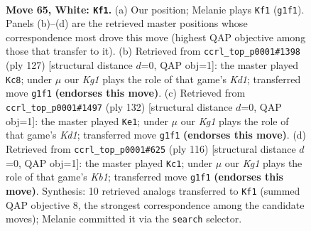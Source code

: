 \documentclass[11pt]{article}
\begin{document}
\clearpage

\begin{figure}[p]\centering
\begin{subfigure}{0.46\textwidth}\centering
\resizebox{\linewidth}{!}{%
\newchessgame
\chessboard[
  setfen={5k2/8/2r5/8/8/7R/8/6K1 w - - 10 65},
  showmover=false,
  pgfstyle=straightmove, color=movearrow, markmove={g1-f1}
]}
\caption{}
\end{subfigure}\hfill
\begin{subfigure}{0.46\textwidth}\centering
\resizebox{\linewidth}{!}{%
\newchessgame
\chessboard[
  setfen={3k4/8/7r/8/R7/8/8/3K4 b - - 6 64},
  showmover=false,
  pgfstyle=straightmove, color=movearrow, markmove={d8-c8}
]}
\caption{}
\end{subfigure}
\\[4pt]
\begin{subfigure}{0.46\textwidth}\centering
\resizebox{\linewidth}{!}{%
\newchessgame
\chessboard[
  setfen={2R5/5r2/8/8/6k1/8/8/3K4 w - - 13 67},
  showmover=false,
  pgfstyle=straightmove, color=movearrow, markmove={d1-e1}
]}
\caption{}
\end{subfigure}\hfill
\begin{subfigure}{0.46\textwidth}\centering
\resizebox{\linewidth}{!}{%
\newchessgame
\chessboard[
  setfen={2k5/8/6r1/7R/8/8/8/1K6 w - - 18 59},
  showmover=false,
  pgfstyle=straightmove, color=movearrow, markmove={b1-c1}
]}
\caption{}
\end{subfigure}
\caption{\textbf{Move 65, White: \texttt{Kf1}.} (a) Our position; Melanie plays \texttt{Kf1} (\texttt{g1f1}). Panels (b)--(d) are the retrieved master positions whose correspondence most drove this move (highest QAP objective among those that transfer to it). (b) Retrieved from \texttt{ccrl\_top\_p0001\#1398} (ply 127) [structural distance $d$=0, QAP obj=1]: the master played \texttt{Kc8}; under $\mu$ our \emph{Kg1} plays the role of that game's \emph{Kd1}; transferred move \texttt{g1f1} \textbf{(endorses this move)}. (c) Retrieved from \texttt{ccrl\_top\_p0001\#1497} (ply 132) [structural distance $d$=0, QAP obj=1]: the master played \texttt{Ke1}; under $\mu$ our \emph{Kg1} plays the role of that game's \emph{Kd1}; transferred move \texttt{g1f1} \textbf{(endorses this move)}. (d) Retrieved from \texttt{ccrl\_top\_p0001\#625} (ply 116) [structural distance $d$=0, QAP obj=1]: the master played \texttt{Kc1}; under $\mu$ our \emph{Kg1} plays the role of that game's \emph{Kb1}; transferred move \texttt{g1f1} \textbf{(endorses this move)}. Synthesis: 10 retrieved analogs transferred to \texttt{Kf1} (summed QAP objective 8, the strongest correspondence among the candidate moves); Melanie committed it via the \texttt{search} selector.}
\label{fig:thought-m128}
\end{figure}
\end{document}
